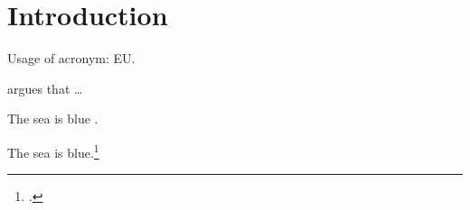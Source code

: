 \chapter{Introduction}

Usage of acronym: \ac{EU}.

\textcite{doe2016} argues that \dots

The sea is blue \citep{doe2016}.

The sea is blue.\footcite{doe2016}
